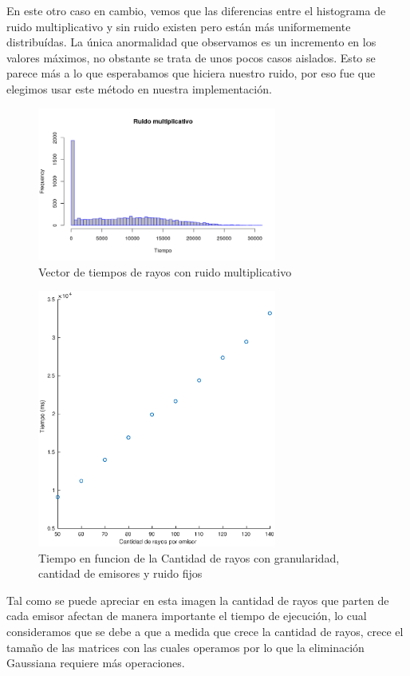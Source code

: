 \par En este otro caso en cambio, vemos que las diferencias entre el histograma de ruido multiplicativo y sin ruido existen pero están más uniformemente distribuídas. La única anormalidad que observamos es un incremento en los valores máximos, no obstante se trata de unos pocos casos aislados.
Esto se parece más a lo que esperabamos que hiciera nuestro ruido, por eso fue que elegimos usar este método en nuestra implementación.
\begin{figure}[H]
	\centering	\includegraphics[width=0.7\textwidth]{img/ruidoMultiplicativo.png}
	\caption{Vector de tiempos de rayos con ruido multiplicativo}
	\label{fig:etiqueta}
\end{figure}



\begin{figure}[H]
	\centering	\includegraphics[width=0.7\textwidth]{img/cantrayos_tiempo}
	\caption{Tiempo en funcion de la Cantidad de rayos con granularidad, cantidad de emisores y ruido fijos}
	\label{fig:cantrayos_tiempo}
\end{figure}
\par Tal como se puede apreciar en esta imagen la cantidad de rayos que parten de cada emisor afectan de manera importante el tiempo de ejecuci\'on, lo cual consideramos que se debe a que a medida que crece la cantidad de rayos, crece el 
tamaño de las matrices con las cuales operamos por lo que la eliminaci\'on Gaussiana requiere m\'as operaciones.


